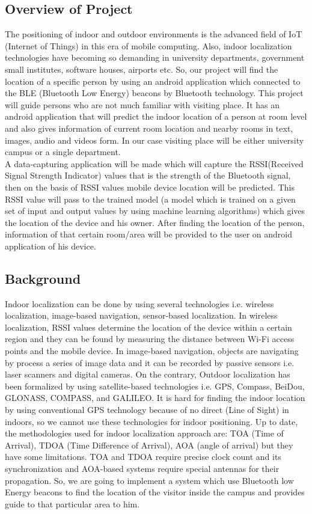 \documentclass{article}
\begin{document}
\subsection{Overview of Project}
The positioning of indoor and outdoor environments is the advanced field of IoT (Internet of Things) in this era of mobile computing. Also, indoor localization technologies have becoming so demanding in university departments, government small institutes, software houses, airports etc. So, our project will find the location of a specific person by using an android application which connected to the BLE (Bluetooth Low Energy) beacons by Bluetooth technology. This project will guide persons who are not much familiar with visiting place. It has an android application that will predict the indoor location of a person at room level and also gives information of current room location and nearby rooms in text, images, audio and videos form. In our case visiting place will be either university campus or a single department.\cite{Introduction}
\\
A data-capturing application will be made which will capture the RSSI(Received Signal Strength Indicator) values that is the strength of the Bluetooth signal, then on the basis of RSSI values mobile device location will be predicted. This RSSI value will pass to the trained model (a model which is trained on a given set of input and output values by using machine learning algorithms) which gives the location of the device and his owner. After finding the location of the person, information of that certain room/area will be provided to the user on android application of his device.\cite{research1}\\



\subsection{Background}
Indoor localization can be done by using several technologies i.e. wireless localization, image-based navigation, sensor-based localization. In wireless localization, RSSI values determine the location of the device within a certain region and they can be found by measuring the distance between Wi-Fi access points and the mobile device. In image-based navigation, objects are navigating by process a series of image data and it can be recorded by passive sensors i.e. laser scanners and digital cameras. On the contrary, Outdoor localization has been formalized by using satellite-based technologies i.e. GPS, Compass, BeiDou, GLONASS, COMPASS, and GALILEO. It is hard for finding the indoor location by using conventional GPS technology because of no direct (Line of Sight) in indoors\cite{research2}, so we cannot use these technologies for indoor positioning. Up to date, the methodologies used for indoor localization approach are: TOA (Time of Arrival), TDOA (Time Difference of Arrival), AOA (angle of arrival) but they have some limitations. TOA and TDOA require precise clock count and its synchronization and AOA-based systems require special antennas for their propagation. So, we are going to implement a system which use Bluetooth low Energy beacons to find the location of the visitor inside the campus and provides guide to that particular area to him.
\end{document}
